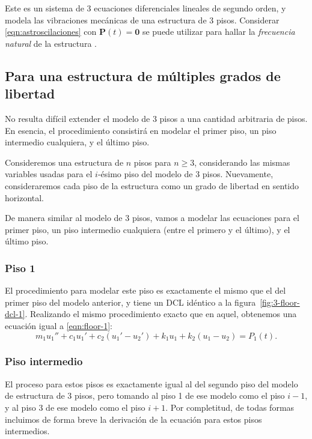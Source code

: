 Este es un sistema de 3 ecuaciones diferenciales lineales de segundo orden, y modela las vibraciones mecánicas de una estructura de 3 pisos. Considerar \eqref{eqn:astroscilaciones} con \(\mathbf{P}(t) = \mathbf{0}\) se puede utilizar para hallar la \textit{frecuencia natural} de la estructura \citep{rendon}.

\subsection{Para una estructura de múltiples grados de libertad}

No resulta difícil extender el modelo de 3 pisos a una cantidad arbitraria de pisos. En esencia, el procedimiento consistirá en modelar el primer piso, un piso intermedio cualquiera, y el último piso.

Consideremos una estructura de \(n\) pisos para \(n \geq 3\), considerando las mismas variables usadas para el \(i\)-ésimo piso del modelo de 3 pisos. Nuevamente, consideraremos cada piso de la estructura como un grado de libertad en sentido horizontal.

De manera similar al modelo de 3 pisos, vamos a modelar las ecuaciones para el primer piso, un piso intermedio cualquiera (entre el primero y el último), y el último piso.

\subsubsection*{Piso 1}

El procedimiento para modelar este piso es exactamente el mismo que el del primer piso del modelo anterior, y tiene un DCL idéntico a la figura~\ref{fig:3-floor-dcl-1}. Realizando el mismo procedimiento exacto que en aquel, obtenemos una ecuación igual a \eqref{eqn:floor-1}:
\begin{equation}\label{eqn:final-floor-1}
    m_1 u_1'' + c_1 u_1' + c_2(u_1' - u_2') + k_1 u_1 + k_2(u_1 - u_2) = P_1(t)
.\end{equation}

\subsubsection*{Piso intermedio}

El proceso para estos pisos es exactamente igual al del segundo piso del modelo de estructura de 3 pisos, pero tomando al piso 1 de ese modelo como el piso \(i - 1\), y al piso 3 de ese modelo como el piso \(i + 1\). Por completitud, de todas formas incluimos de forma breve la derivación de la ecuación para estos pisos intermedios.

